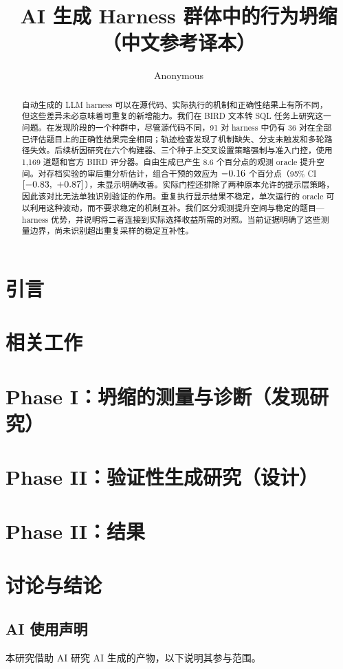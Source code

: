 \documentclass{article}
\title{AI 生成 Harness 群体中的行为坍缩\\（中文参考译本）}
\author{Anonymous}
\begin{document}
\maketitle
\begin{abstract}
自动生成的 LLM harness 可以在源代码、实际执行的机制和正确性结果上有所不同，但这些差异未必意味着可重复的新增能力。我们在 BIRD 文本转 SQL 任务上研究这一问题。在发现阶段的一个种群中，尽管源代码不同，91 对 harness 中仍有 36 对在全部已评估题目上的正确性结果完全相同；轨迹检查发现了机制缺失、分支未触发和多轮路径失效。后续析因研究在六个构建器、三个种子上交叉设置策略强制与准入门控，使用 1,169 道题和官方 BIRD 评分器。自由生成已产生 8.6 个百分点的观测 oracle 提升空间。对存档实验的审后重分析估计，组合干预的效应为 $-0.16$ 个百分点（95\% CI $[-0.83,\ +0.87]$），未显示明确改善。实际门控还排除了两种原本允许的提示层策略，因此该对比无法单独识别验证的作用。重复执行显示结果不稳定，单次运行的 oracle 可以利用这种波动，而不要求稳定的机制互补。我们区分观测提升空间与稳定的题目—harness 优势，并说明将二者连接到实际选择收益所需的对照。当前证据明确了这些测量边界，尚未识别超出重复采样的稳定互补性。
\end{abstract}
\section{引言}\label{sec:introduction}

\section{相关工作}\label{sec:related}

\section{Phase I：坍缩的测量与诊断（发现研究）}\label{sec:phase1}

\section{Phase II：验证性生成研究（设计）}\label{sec:phase2}

\section{Phase II：结果}\label{sec:results}

\section{讨论与结论}\label{sec:discussion}


\label{endofmain}
\subsection*{AI 使用声明}
本研究借助 AI 研究 AI 生成的产物，以下说明其参与范围。
\end{document}
